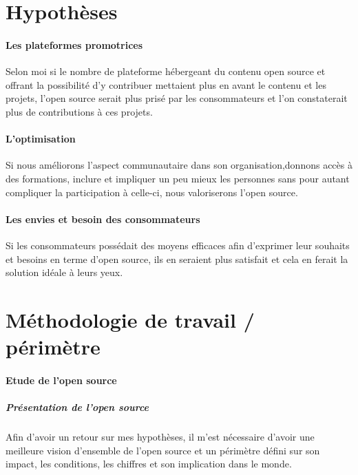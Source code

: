 	\section{Hypothèses}

		\paragraph{Les plateformes promotrices\\}

			Selon moi si le nombre de plateforme hébergeant du contenu open source et offrant la possibilité d'y contribuer mettaient plus en avant le contenu et les projets, l'open source serait plus prisé par les consommateurs et l'on constaterait plus de contributions à ces projets.

		\paragraph{L'optimisation\\}

			Si nous améliorons l'aspect communautaire dans son organisation,donnons accès à des formations, inclure et impliquer un peu mieux les personnes sans pour autant compliquer la participation à celle-ci, nous valoriserons l'open source.

		\paragraph{Les envies et besoin des consommateurs\\}

			Si les consommateurs possédait des moyens efficaces afin d'exprimer leur souhaits et besoins en terme d'open source, ils en seraient plus satisfait et cela en ferait la solution idéale à leurs yeux.

	\section{Méthodologie de travail / périmètre}
		\paragraph{Etude de l'open source}

			\subparagraph{Présentation de l'open source\\}

				Afin d'avoir un retour sur mes hypothèses, il m'est nécessaire d'avoir une meilleure vision d'ensemble de l'open source et un périmètre défini sur son impact, les conditions, les chiffres et son implication dans le monde.

